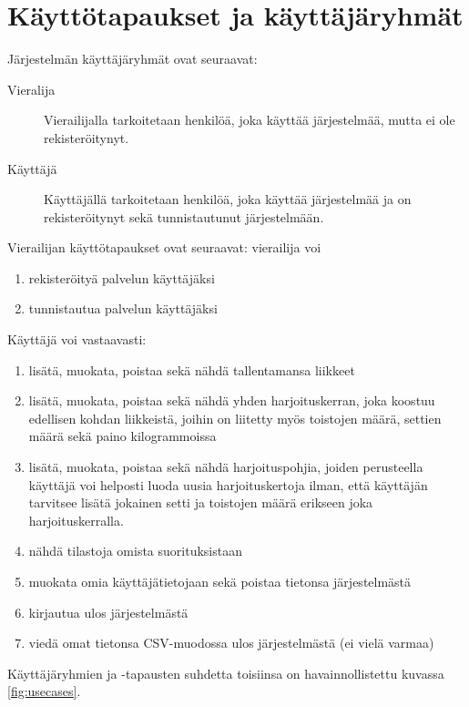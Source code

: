 \documentclass{article}
\begin{document}
\section{Käyttötapaukset ja käyttäjäryhmät}
Järjestelmän käyttäjäryhmät ovat seuraavat:
\begin{description}
  \item [Vieralija] Vierailijalla tarkoitetaan henkilöä, joka käyttää järjestelmää, mutta ei ole rekisteröitynyt.
  \item [Käyttäjä] Käyttäjällä tarkoitetaan henkilöä, joka käyttää järjestelmää ja on rekisteröitynyt sekä tunnistautunut järjestelmään.
\end{description}
Vierailijan käyttötapaukset ovat seuraavat: vierailija voi
\begin{enumerate}
  \item rekisteröityä palvelun käyttäjäksi
  \item tunnistautua palvelun käyttäjäksi
\end{enumerate}
Käyttäjä voi vastaavasti:
\begin{enumerate}
  \item lisätä, muokata, poistaa sekä nähdä tallentamansa liikkeet
  \item lisätä, muokata, poistaa sekä nähdä yhden harjoituskerran, joka koostuu edellisen kohdan liikkeistä, joihin on liitetty myös toistojen määrä, settien määrä sekä paino kilogrammoissa
  \item lisätä, muokata, poistaa sekä nähdä harjoituspohjia, joiden perusteella käyttäjä voi helposti luoda uusia harjoituskertoja ilman, että käyttäjän tarvitsee lisätä jokainen setti ja toistojen määrä erikseen joka harjoituskerralla.
  \item nähdä tilastoja omista suorituksistaan
  \item muokata omia käyttäjätietojaan sekä poistaa tietonsa järjestelmästä
  \item kirjautua ulos järjestelmästä
  \item viedä omat tietonsa CSV-muodossa ulos järjestelmästä (ei vielä varmaa)
\end{enumerate}
Käyttäjäryhmien ja -tapausten suhdetta toisiinsa on havainnollistettu kuvassa \ref{fig:usecases}.
\end{document}
